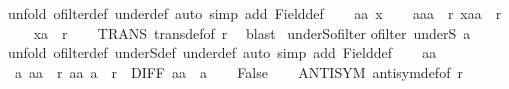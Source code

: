 \begin{isabellebody}
{\isacharparenleft}{\kern0pt}unfold\ ofilter{\isacharunderscore}{\kern0pt}def\ under{\isacharunderscore}{\kern0pt}def{\isacharcomma}{\kern0pt}\ auto\ simp\ add{\isacharcolon}{\kern0pt}\ Field{\isacharunderscore}{\kern0pt}def{\isacharparenright}{\kern0pt}\isanewline
\ \ \isamarkupfalse%
\ aa\ x\isanewline
\ \ \isamarkupfalse%
\ {\isachardoublequoteopen}{\isacharparenleft}{\kern0pt}aa{\isacharcomma}{\kern0pt}a{\isacharparenright}{\kern0pt}\ {\isasymin}\ r{\isachardoublequoteclose}\ {\isachardoublequoteopen}{\isacharparenleft}{\kern0pt}x{\isacharcomma}{\kern0pt}aa{\isacharparenright}{\kern0pt}\ {\isasymin}\ r{\isachardoublequoteclose}\isanewline
\ \ \isamarkupfalse%
\ {\isachardoublequoteopen}{\isacharparenleft}{\kern0pt}x{\isacharcomma}{\kern0pt}a{\isacharparenright}{\kern0pt}\ {\isasymin}\ r{\isachardoublequoteclose}\isanewline
\ \ \isamarkupfalse%
\ TRANS\ trans{\isacharunderscore}{\kern0pt}def{\isacharbrackleft}{\kern0pt}of\ r{\isacharbrackright}{\kern0pt}\ \isamarkupfalse%
\ blast\isanewline
{}\isamarkupfalse%
%
\endisatagproof
{\isafoldproof}%
%
\isadelimproof
\isanewline
%
\endisadelimproof
\isanewline
{}\isamarkupfalse%
\ underS{\isacharunderscore}{\kern0pt}ofilter{\isacharcolon}{\kern0pt}\isanewline
{\isachardoublequoteopen}ofilter\ {\isacharparenleft}{\kern0pt}underS\ a{\isacharparenright}{\kern0pt}{\isachardoublequoteclose}\isanewline
%
\isadelimproof
%
\endisadelimproof
%
\isatagproof
{}\isamarkupfalse%
{\isacharparenleft}{\kern0pt}unfold\ ofilter{\isacharunderscore}{\kern0pt}def\ underS{\isacharunderscore}{\kern0pt}def\ under{\isacharunderscore}{\kern0pt}def{\isacharcomma}{\kern0pt}\ auto\ simp\ add{\isacharcolon}{\kern0pt}\ Field{\isacharunderscore}{\kern0pt}def{\isacharparenright}{\kern0pt}\isanewline
\ \ \isamarkupfalse%
\ aa\ \isamarkupfalse%
\ {\isachardoublequoteopen}{\isacharparenleft}{\kern0pt}a{\isacharcomma}{\kern0pt}\ aa{\isacharparenright}{\kern0pt}\ {\isasymin}\ r{\isachardoublequoteclose}\ {\isachardoublequoteopen}{\isacharparenleft}{\kern0pt}aa{\isacharcomma}{\kern0pt}\ a{\isacharparenright}{\kern0pt}\ {\isasymin}\ r{\isachardoublequoteclose}\ \ DIFF{\isacharcolon}{\kern0pt}\ {\isachardoublequoteopen}aa\ {\isasymnoteq}\ a{\isachardoublequoteclose}\isanewline
\ \ \isamarkupfalse%
\ False\isanewline
\ \ \isamarkupfalse%
\ ANTISYM\ antisym{\isacharunderscore}{\kern0pt}def{\isacharbrackleft}{\kern0pt}of\ r{\isacharbrackright}{\kern0pt}\ \isamarkupfalse%

\end{isabellebody}
